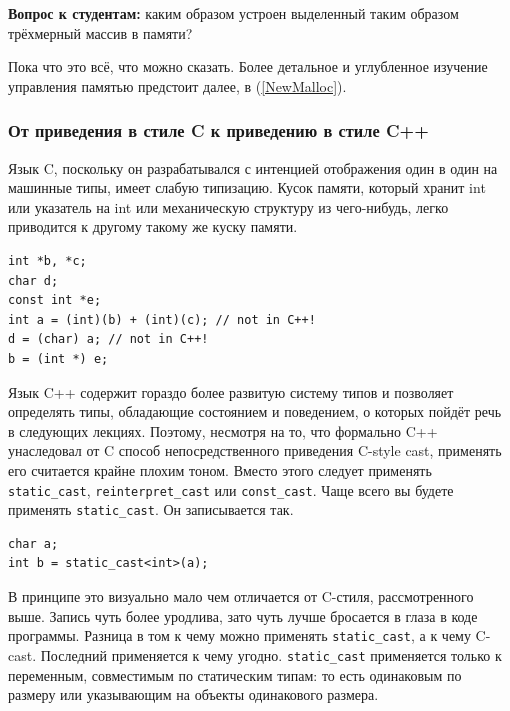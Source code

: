 \documentclass[a4paper,12pt,oneside]{article}
\newif\ifanswers
\begin{document}
\textbf{Вопрос к студентам:} каким образом устроен выделенный таким образом трёхмерный массив в памяти?

\ifanswers
Правильный ответ: это jagged-вектор из одномерных массивов с двумерным доступом к каждому
\fi

Пока что это всё, что можно сказать. Более детальное и углубленное изучение управления памятью предстоит далее, в (\ref{NewMalloc}).

\subsubsection{От приведения в стиле C к приведению в стиле C++}\label{FromCCastToCPP}

Язык C, поскольку он разрабатывался с интенцией отображения один в один на машинные типы, имеет слабую типизацию. Кусок памяти, который хранит int или указатель на int или механическую структуру из чего-нибудь, легко приводится к другому такому же куску памяти.

\begin{lstlisting}
int *b, *c;
char d;
const int *e;
int a = (int)(b) + (int)(c); // not in C++! 
d = (char) a; // not in C++! 
b = (int *) e;
\end{lstlisting}

Язык C++ содержит гораздо более развитую систему типов и позволяет определять типы, обладающие состоянием и поведением, о которых пойдёт речь в следующих лекциях. Поэтому, несмотря на то, что формально C++ унаследовал от C способ непосредственного приведения C-style cast, применять его считается крайне плохим тоном. Вместо этого следует применять \lstinline!static_cast!, \lstinline!reinterpret_cast! или \lstinline!const_cast!. Чаще всего вы будете применять \lstinline!static_cast!. Он записывается так.

\begin{lstlisting}
char a;
int b = static_cast<int>(a);
\end{lstlisting}

В принципе это визуально мало чем отличается от C-стиля, рассмотренного выше. Запись чуть более уродлива, зато чуть лучше бросается в глаза в коде программы. Разница в том к чему можно применять \lstinline!static_cast!, а к чему C-cast. Последний применяется к чему угодно. \lstinline!static_cast! применяется только к переменным, совместимым по статическим типам: то есть одинаковым по размеру или указывающим на объекты одинакового размера.
\end{document}
